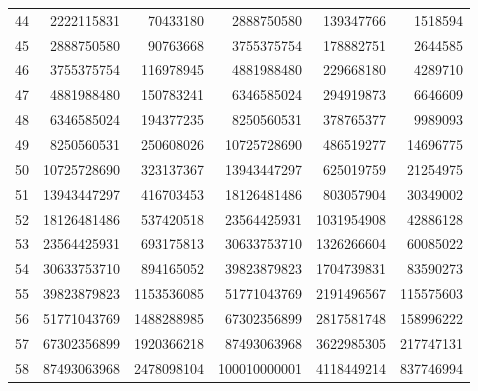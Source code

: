 \documentclass[11pt,a4paper]{article}
\theoremstyle{definition}
\begin{document}
{\begin{longtable}{rrrrrr}
44 & 2222115831 & 70433180 & 2888750580 & 139347766 & 1518594 \\
45 & 2888750580 & 90763668 & 3755375754 & 178882751 & 2644585 \\
46 & 3755375754 & 116978945 & 4881988480 & 229668180 & 4289710 \\
47 & 4881988480 & 150783241 & 6346585024 & 294919873 & 6646609 \\
48 & 6346585024 & 194377235 & 8250560531 & 378765377 & 9989093 \\
49 & 8250560531 & 250608026 & 10725728690 & 486519277 & 14696775 \\
50 & 10725728690 & 323137367 & 13943447297 & 625019759 & 21254975 \\
51 & 13943447297 & 416703453 & 18126481486 & 803057904 & 30349002 \\
52 & 18126481486 & 537420518 & 23564425931 & 1031954908 & 42886128 \\
53 & 23564425931 & 693175813 & 30633753710 & 1326266604 & 60085022 \\
54 & 30633753710 & 894165052 & 39823879823 & 1704739831 & 83590273 \\
55 & 39823879823 & 1153536085 & 51771043769 & 2191496567 & 115575603 \\
56 & 51771043769 & 1488288985 & 67302356899 & 2817581748 & 158996222 \\
57 & 67302356899 & 1920366218 & 87493063968 & 3622985305 & 217747131 \\
58 & 87493063968 & 2478098104 & 100010000001 & 4118449214 & 837746994 \\
\bottomrule
\end{longtable}

}
\end{document}
